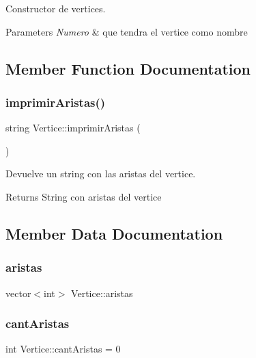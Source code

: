 Constructor de vertices. 


\begin{DoxyParams}{Parameters}
{\em Numero} & que tendra el vertice como nombre \\
\hline
\end{DoxyParams}


\subsection{Member Function Documentation}
\mbox{\label{structVertice_aad9de18b651baaa1cbc175aa6b492935}} 
\subsubsection{\texorpdfstring{imprimir\+Aristas()}{imprimirAristas()}}
{\footnotesize\ttfamily string Vertice\+::imprimir\+Aristas (\begin{DoxyParamCaption}{ }\end{DoxyParamCaption})}



Devuelve un string con las aristas del vertice. 

\begin{DoxyReturn}{Returns}
String con aristas del vertice 
\end{DoxyReturn}


\subsection{Member Data Documentation}
\mbox{\label{structVertice_a444d610323bf6d21b796f4847a347de6}} 
\subsubsection{\texorpdfstring{aristas}{aristas}}
{\footnotesize\ttfamily vector$<$int$>$ Vertice\+::aristas}

\mbox{\label{structVertice_abde74728052701740c6f043c3729f91b}} 
\subsubsection{\texorpdfstring{cant\+Aristas}{cantAristas}}
{\footnotesize\ttfamily int Vertice\+::cant\+Aristas = 0}

